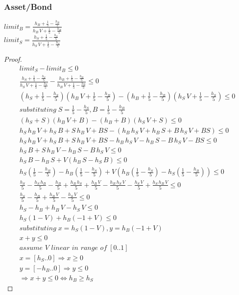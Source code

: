 \documentclass[Bachelorarbeit.tex]{subfiles}
\begin{document}
\pagebreak
\subsubsection{Asset/Bond}
$limit_B = \frac{h_B + \frac{1}{5} - \frac{h_B}{5}}{h_B \, V + \frac{1}{5} - \frac{h_B}{5}}$ \\
$limit_S = \frac{h_S + \frac{1}{5} - \frac{h_S}{5}}{h_S \, V + \frac{1}{5} - \frac{h_S}{5}}$ \\

\begin{proof}
\begin{align*}
	limit_S - limit_B \leq 0
	\\ \frac{h_S + \frac{1}{5} - \frac{h_S}{5}}{h_S \, V + \frac{1}{5} - \frac{h_S}{5}} - \frac{h_B + \frac{1}{5} - \frac{h_B}{5}}{h_B \, V + \frac{1}{5} - \frac{h_B}{5}} \leq 0
	\\ (h_S + \frac{1}{5} - \frac{h_S}{5})(h_B \, V + \frac{1}{5} - \frac{h_B}{5}) - (h_B + \frac{1}{5} - \frac{h_B}{5})(h_S \, V + \frac{1}{5} - \frac{h_S}{5}) \leq 0													
	\\ substituting \; S = \frac{1}{5} - \frac{h_S}{5}, B = \frac{1}{5} - \frac{h_B}{5}
	\\ (h_S + S)(h_B \, V + B) - (h_B + B)(h_S \, V + S) \leq 0
	\\ h_S \, h_B \, V + h_S \, B + S \, h_B \, V + BS - (h_B \, h_S \, V + h_B \, S + B \, h_S \, V + BS) \leq 0
	\\ h_S \, h_B \, V + h_S \, B + S \, h_B \, V + BS - h_B \, h_S \, V - h_B \, S - B \, h_S \, V - BS \leq 0
	\\ h_S \, B + S \, h_B \, V - h_B \, S - B \, h_S \, V \leq 0
	\\ h_S \, B - h_B \, S + V(h_B \, S - h_S \, B ) \leq 0 
	\\ h_S(\frac{1}{5} - \frac{h_B}{5}) - h_B(\frac{1}{5} - \frac{h_S}{5}) + V(h_B(\frac{1}{5} - \frac{h_S}{5}) - h_S(\frac{1}{5} - \frac{h_B}{5})) \leq 0
	\\ \frac{h_S}{5} - \frac{h_S \, h_B}{5} - \frac{h_B}{5} + \frac{h_B \, h_S}{5} + \frac{h_B \, V}{5} - \frac{h_B \, h_S \, V}{5} - \frac{h_S \, V}{5} + \frac{h_S \, h_B \, V}{5} \leq 0 
	\\ \frac{h_S}{5} - \frac{h_B}{5} + \frac{h_B \, V}{5} - \frac{h_S \, V}{5} \leq 0
	\\ h_S - h_B + h_B \, V - h_S \, V \leq 0 
	\\ h_S( 1 - V ) + h_B( -1 + V ) \leq 0 
	\\ substituting \; x = h_S( 1 - V ), y = h_B( -1 + V )
	\\ x + y \leq 0 									
	\\ \textit{assume V linear in range of} \; [0..1]
	\\ x = [h_S..0] \Rightarrow x \geq 0 
	\\ y = [-h_B..0] \Rightarrow y \leq 0
	\\ \Rightarrow x + y \leq 0 \iff h_B \geq h_S
\end{align*}
\end{proof}
\end{document}
